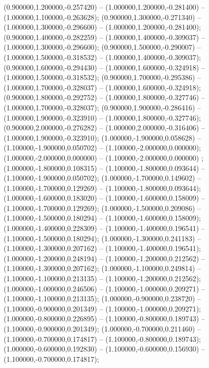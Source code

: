  (0.900000,1.200000,-0.257420) -- (1.000000,1.200000,-0.281400) -- (1.000000,1.100000,-0.263628);
 (0.900000,1.300000,-0.271340) -- (1.000000,1.300000,-0.296600) -- (1.000000,1.200000,-0.281400);
 (0.900000,1.400000,-0.282259) -- (1.000000,1.400000,-0.309037) -- (1.000000,1.300000,-0.296600);
 (0.900000,1.500000,-0.290007) -- (1.000000,1.500000,-0.318532) -- (1.000000,1.400000,-0.309037);
 (0.900000,1.600000,-0.294430) -- (1.000000,1.600000,-0.324918) -- (1.000000,1.500000,-0.318532);
 (0.900000,1.700000,-0.295386) -- (1.000000,1.700000,-0.328037) -- (1.000000,1.600000,-0.324918);
 (0.900000,1.800000,-0.292752) -- (1.000000,1.800000,-0.327746) -- (1.000000,1.700000,-0.328037);
 (0.900000,1.900000,-0.286416) -- (1.000000,1.900000,-0.323910) -- (1.000000,1.800000,-0.327746);
 (0.900000,2.000000,-0.276282) -- (1.000000,2.000000,-0.316406) -- (1.000000,1.900000,-0.323910);
 (1.000000,-1.900000,0.058628) -- (1.100000,-1.900000,0.050702) -- (1.100000,-2.000000,0.000000);
 (1.000000,-2.000000,0.000000) -- (1.100000,-2.000000,0.000000) ;
 (1.000000,-1.800000,0.108315) -- (1.100000,-1.800000,0.093644) -- (1.100000,-1.900000,0.050702);
 (1.000000,-1.700000,0.149602) -- (1.100000,-1.700000,0.129269) -- (1.100000,-1.800000,0.093644);
 (1.000000,-1.600000,0.183020) -- (1.100000,-1.600000,0.158009) -- (1.100000,-1.700000,0.129269);
 (1.000000,-1.500000,0.209086) -- (1.100000,-1.500000,0.180294) -- (1.100000,-1.600000,0.158009);
 (1.000000,-1.400000,0.228309) -- (1.100000,-1.400000,0.196541) -- (1.100000,-1.500000,0.180294);
 (1.000000,-1.300000,0.241183) -- (1.100000,-1.300000,0.207162) -- (1.100000,-1.400000,0.196541);
 (1.000000,-1.200000,0.248194) -- (1.100000,-1.200000,0.212562) -- (1.100000,-1.300000,0.207162);
 (1.000000,-1.100000,0.249814) -- (1.100000,-1.100000,0.213135) -- (1.100000,-1.200000,0.212562);
 (1.000000,-1.000000,0.246506) -- (1.100000,-1.000000,0.209271) -- (1.100000,-1.100000,0.213135);
 (1.000000,-0.900000,0.238720) -- (1.100000,-0.900000,0.201349) -- (1.100000,-1.000000,0.209271);
 (1.000000,-0.800000,0.226895) -- (1.100000,-0.800000,0.189743) -- (1.100000,-0.900000,0.201349);
 (1.000000,-0.700000,0.211460) -- (1.100000,-0.700000,0.174817) -- (1.100000,-0.800000,0.189743);
 (1.000000,-0.600000,0.192830) -- (1.100000,-0.600000,0.156930) -- (1.100000,-0.700000,0.174817);
